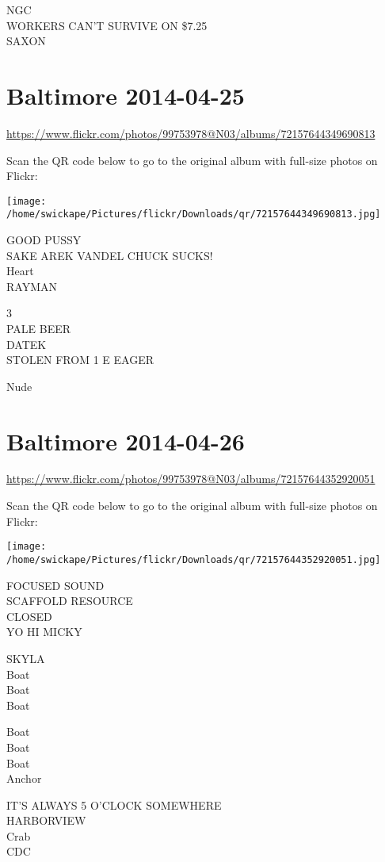 \documentclass[10pt,letterpaper]{article}
\begin{document}
NGC\\
WORKERS CAN'T SURVIVE ON \$7.25\\
SAXON


\section*{Baltimore 2014-04-25}

\url{https://www.flickr.com/photos/99753978@N03/albums/72157644349690813}

Scan the QR code below to go to the original album with full-size photos on Flickr:

\texttt{[image: /home/swickape/Pictures/flickr/Downloads/qr/72157644349690813.jpg]}


GOOD PUSSY\\
SAKE AREK VANDEL CHUCK SUCKS!\\
Heart\\
RAYMAN

3\\
PALE BEER\\
DATEK\\
STOLEN FROM 1 E EAGER

Nude


\section*{Baltimore 2014-04-26}

\url{https://www.flickr.com/photos/99753978@N03/albums/72157644352920051}

Scan the QR code below to go to the original album with full-size photos on Flickr:

\texttt{[image: /home/swickape/Pictures/flickr/Downloads/qr/72157644352920051.jpg]}


FOCUSED SOUND\\
SCAFFOLD RESOURCE\\
CLOSED\\
YO HI MICKY

SKYLA\\
Boat\\
Boat\\
Boat

Boat\\
Boat\\
Boat\\
Anchor

IT'S ALWAYS 5 O'CLOCK SOMEWHERE\\
HARBORVIEW\\
Crab\\
CDC
\end{document}
